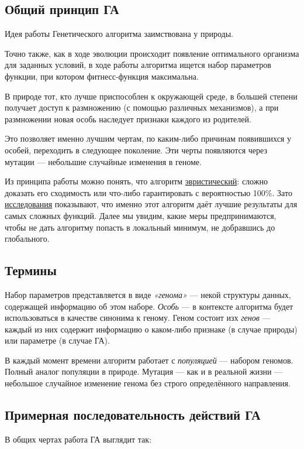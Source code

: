 \subsection{Общий принцип ГА}\label{subsec:ga_general_principles}
Идея работы Генетического алгоритма заимствована у природы.

Точно также, как в ходе эволюции происходит появление оптимального организма для заданных условий,
в ходе работы алгоритма ищется набор параметров функции, при котором фитнесс-функция максимальна.

В природе тот, кто лучше приспособлен к окружающей среде, в большей степени получает доступ к размножению (с помощью различных механизмов),
а при размножении новая особь наследует признаки каждого из родителей.

Это позволяет именно лучшим чертам, по каким-либо причинам появившихся у особей, переходить в следующее поколение.
Эти черты появляются через мутации — небольшие случайные изменения в геноме.

Из принципа работы можно понять, что алгоритм \href{https://en.wikipedia.org/wiki/Heuristic_(computer_science)}{эвристический}: сложно доказать его сходимость или что-либо гарантировать с вероятностью 100\%.
Зато \href{talgat.org/news/wp-content/uploads/2018/08/112.pdf}{исследования} показывают, что именно этот алгоритм даёт лучшие результаты для самых сложных функций.
Далее мы увидим, какие меры предпринимаются, чтобы не дать алгоритму попасть в локальный минимум, не добравшись до глобального.

\subsection{Термины}\label{subsec:ga_principles}
Набор параметров представляется в виде \textit{«генома»} — некой структуры данных, содержащей информацию об этом наборе.
\textit{Особь} — в контексте алгоритма будет использоваться в качестве синонима к геному.
Геном состоит изх \textit{генов} — каждый из них содержит информацию о каком-либо признаке (в случае природы) или параметре (в случае ГА).

В каждый момент времени алгоритм работает с \textit{популяцией} — набором геномов. Полный аналог популяции в природе.
Мутация — как и в реальной жизни — небольшое случайное изменение генома без строго определённого направления.

\subsection{Примерная последовательность действий ГА}\label{subsec:approx_ga_algo}
В общих чертах работа ГА выглядит так:

